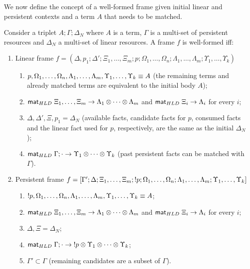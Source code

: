 We now define the concept of a well-formed frame given initial linear and
persistent contexts and a term $A$ that needs to be matched.

\begin{definition}

Consider a triplet $A; \Gamma; \Delta_{N}$ where $A$ is a term, $\Gamma$ is a
multi-set of persistent resources and $\Delta_{N}$ a multi-set of linear
resources. A frame $f$ is well-formed iff:

\begin{enumerate}[leftmargin=*]
   \item Linear frame $f = (\Delta, p_1; \Delta'; \Xi_1, \dotsc, \Xi_m; p;
         \Omega_1, \dotsc, \Omega_n; \Lambda_1, \dotsc, \Lambda_m; \Upsilon_1,
         \dotsc, \Upsilon_k)$

   \begin{enumerate}
      \item $p, \Omega_1, \dotsc, \Omega_n, \Lambda_1, \dotsc, \Lambda_m,
         \Upsilon_1, \dotsc, \Upsilon_k \equiv A$ (the remaining terms and already
               matched terms are equivalent to the initial body $A$);
      \item $\mathsf{mat}_{HLD} \; \Xi_1, \dotsc, \Xi_m \rightarrow \Lambda_1 \otimes \dotsb \otimes
      \Lambda_m$ and $\mathsf{mat}_{HLD} \; \Xi_i \rightarrow \Lambda_i$ for every $i$;

      \item $\Delta, \Delta', \Xi, p_1 = \Delta_{N}$ (available facts, candidate
            facts for $p$, consumed facts and the linear fact used for $p$,
            respectively, are the same as the initial $\Delta_{N}$);

      \item $\mathsf{mat}_{HLD} \; \Gamma; \cdot \rightarrow \Upsilon_1 \otimes \dotsb \otimes
      \Upsilon_k$ (past persistent facts can be matched with $\Gamma$).

   \end{enumerate}
   \item Persistent frame $f = [\Gamma'; \Delta; \Xi_1, \dotsc, \Xi_m; {!} p;
         \Omega_1, \dotsc, \Omega_n; \Lambda_1, \dotsc, \Lambda_m; \Upsilon_1,
         \dotsc, \Upsilon_k]$

      \begin{enumerate}
         \item ${!} p, \Omega_1, \dotsc, \Omega_n, \Lambda_1, \dotsc,
                     \Lambda_m, \Upsilon_1, \dotsc, \Upsilon_k \equiv A$;
         \item $\mathsf{mat}_{HLD} \; \Xi_1, \dots, \Xi_m \rightarrow \Lambda_1 \otimes \dotsb \otimes
                     \Lambda_m$ and $\mathsf{mat}_{HLD} \; \Xi_i \rightarrow \Lambda_i$ for every $i$;
         \item $\Delta, \Xi = \Delta_{N}$;
         \item $\mathsf{mat}_{HLD} \; \Gamma; \cdot \rightarrow {!} p \otimes \Upsilon_1 \otimes
                     \dotsb \otimes \Upsilon_k$;
         \item $\Gamma' \subset \Gamma$ (remaining candidates are a subset of
                     $\Gamma$).
      \end{enumerate}
\end{enumerate}
\end{definition}


